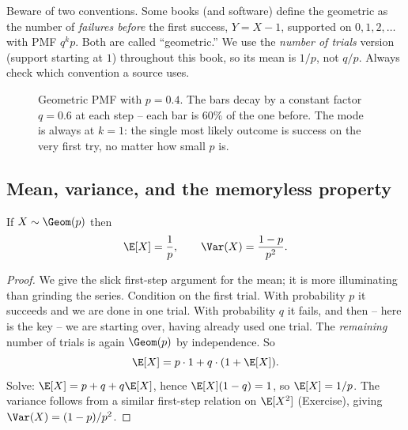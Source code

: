 \begin{marginnotebox}
Beware of two conventions. Some books (and software) define the geometric as the
number of \emph{failures before} the first success, $Y = X - 1$, supported on
$0,1,2,\dots$ with PMF $q^k p$. Both are called ``geometric.'' We use the
\emph{number of trials} version (support starting at $1$) throughout this book, so
its mean is $1/p$, not $q/p$. Always check which convention a source uses.
\end{marginnotebox}

\begin{figure}[H]
\centering
{}
\caption{Geometric PMF with $p=0.4$. The bars decay by a constant factor $q=0.6$
at each step -- each bar is $60\%$ of the one before. The mode is always at
$k=1$: the single most likely outcome is success on the very first try, no matter
how small $p$ is.}
\label{ch07:fig-geom-pmf}
\end{figure}

\subsection{Mean, variance, and the memoryless property}
\label{ch07:geom-mem}

\begin{proposition}
\label{ch07:geom-mv}
If $X \sim \Geom(p)$ then
\[
  \E[X] = \frac{1}{p}, \qquad \Var(X) = \frac{1-p}{p^{2}}.
\]
\end{proposition}

\begin{proof}
We give the slick first-step argument for the mean; it is more illuminating than
grinding the series. Condition on the first trial. With probability $p$ it
succeeds and we are done in one trial. With probability $q$ it fails, and then --
here is the key -- we are starting over, having already used one trial. The
\emph{remaining} number of trials is again $\Geom(p)$ by independence. So
\[
  \E[X] = p \cdot 1 + q \cdot (1 + \E[X]).
\]
Solve: $\E[X] = p + q + q\E[X]$, hence $\E[X](1-q) = 1$, so $\E[X] = 1/p$. The
variance follows from a similar first-step relation on $\E[X^2]$ (Exercise),
giving $\Var(X) = (1-p)/p^2$.
\end{proof}

